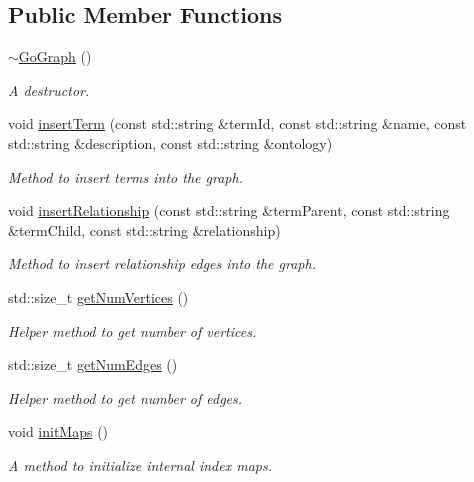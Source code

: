 \subsection*{Public Member Functions}
\begin{DoxyCompactItemize}
\item 
\hyperlink{classGoGraph_a48e691ba5998d709d457a949687fccca}{$\sim$\+Go\+Graph} ()
\begin{DoxyCompactList}\small\item\em A destructor. \end{DoxyCompactList}\item 
void \hyperlink{classGoGraph_a41f698c030fec41fe59ade6d1c73721f}{insert\+Term} (const std\+::string \&term\+Id, const std\+::string \&name, const std\+::string \&description, const std\+::string \&ontology)
\begin{DoxyCompactList}\small\item\em Method to insert terms into the graph. \end{DoxyCompactList}\item 
void \hyperlink{classGoGraph_a346fcf36ed71479d529a2db974ba8bc3}{insert\+Relationship} (const std\+::string \&term\+Parent, const std\+::string \&term\+Child, const std\+::string \&relationship)
\begin{DoxyCompactList}\small\item\em Method to insert relationship edges into the graph. \end{DoxyCompactList}\item 
std\+::size\+\_\+t \hyperlink{classGoGraph_a624f621a9c3cd956fb664daf113e3729}{get\+Num\+Vertices} ()
\begin{DoxyCompactList}\small\item\em Helper method to get number of vertices. \end{DoxyCompactList}\item 
std\+::size\+\_\+t \hyperlink{classGoGraph_acafdd8e76e3813e1276798bed2194232}{get\+Num\+Edges} ()
\begin{DoxyCompactList}\small\item\em Helper method to get number of edges. \end{DoxyCompactList}\item 
void \hyperlink{classGoGraph_ad82f8d33a7ecc220ac0d93147dafc061}{init\+Maps} ()
\begin{DoxyCompactList}\small\item\em A method to initialize internal index maps. \end{DoxyCompactList}\item 

\end{DoxyCompactItemize}
